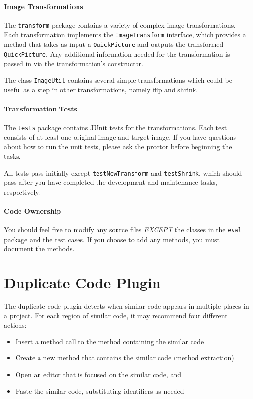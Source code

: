 \documentclass[12pt]{article}
\begin{document}
\paragraph{Image Transformations}

The \verb|transform| package contains a variety of complex image
transformations.  Each transformation implements the
\verb|ImageTransform| interface, which provides a method that takes as
input a \verb|QuickPicture| and outputs the transformed
\verb|QuickPicture|. Any additional information needed for the
transformation is passed in via the transformation's constructor.

The class \verb|ImageUtil| contains several simple transformations
which could be useful as a step in other transformations, namely flip
and shrink.

\paragraph{Transformation Tests}

The \verb|tests| package contains JUnit tests for the
transformations. Each test consists of at least one original image and
target image. If you have questions about how to run the unit tests,
please ask the proctor before beginning the tasks.

All tests pass initially except \verb|testNewTransform|
and \verb|testShrink|, which should pass after you have completed
the development and maintenance tasks, respectively.

\paragraph{Code Ownership}  
You should feel free to modify any source files \textit{EXCEPT} the classes in
the \verb|eval| package and the test cases.  If you choose to add any methods,
you must document the methods.

\section{Duplicate Code Plugin}
The duplicate code plugin detects when similar code appears in
multiple places in a project. For each region of similar code, it may
recommend four different actions:

\begin{itemize}
  \item Insert a method call to the method containing the similar code
  \item Create a new method that contains the similar code (method extraction)
  \item Open an editor that is focused on the similar code, and
  \item Paste the similar code, substituting identifiers as needed
\end{itemize}
\end{document}
